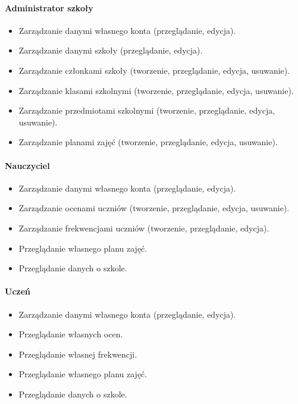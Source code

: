 \documentclass[12pt,a4paper]{article}
\begin{document}
\paragraph{Administrator szkoły}
\begin{itemize}
    \item Zarządzanie danymi własnego konta (przeglądanie, edycja).
    \item Zarządzanie danymi szkoły (przeglądanie, edycja).
    \item Zarządzanie członkami szkoły (tworzenie, przeglądanie, edycja, usuwanie).
    \item Zarządzanie klasami szkolnymi (tworzenie, przeglądanie, edycja, usuwanie).
    \item Zarządzanie przedmiotami szkolnymi (tworzenie, przeglądanie, edycja, usuwanie).
    \item Zarządzanie planami zajęć (tworzenie, przeglądanie, edycja, usuwanie).
\end{itemize}

\paragraph{Nauczyciel}
\begin{itemize}
    \item Zarządzanie danymi własnego konta (przeglądanie, edycja).
    \item Zarządzanie ocenami uczniów (tworzenie, przeglądanie, edycja, usuwanie).
    \item Zarządzanie frekwencjami uczniów (tworzenie, przeglądanie, edycja).
    \item Przeglądanie własnego planu zajęć.
    \item Przeglądanie danych o szkole.
\end{itemize}

\paragraph{Uczeń}
\begin{itemize}
    \item Zarządzanie danymi własnego konta (przeglądanie, edycja).
    \item Przeglądanie własnych ocen.
    \item Przeglądanie własnej frekwencji.
    \item Przeglądanie własnego planu zajęć.
    \item Przeglądanie danych o szkole.
\end{itemize}
\end{document}
